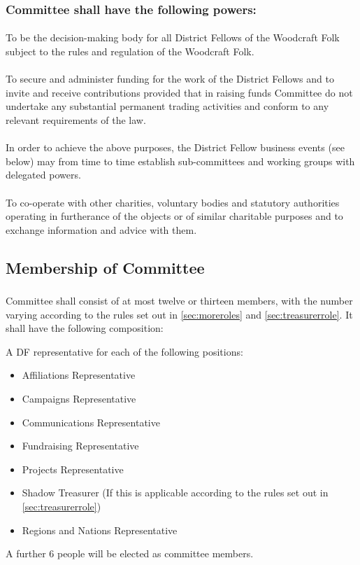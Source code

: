 \documentclass[a4paper, 12pt]{article}
\begin{document}
\subsubsection{Committee shall have the following powers:}
\paragraph{}
To be the decision-making body for all District Fellows of the Woodcraft Folk subject to the rules and regulation of the Woodcraft Folk.
\paragraph{}
To secure and administer funding for the work of the District Fellows and to invite and receive contributions provided that in raising funds Committee do not undertake any substantial permanent trading activities and conform to any relevant requirements of the law.
\paragraph{}
In order to achieve the above purposes, the District Fellow business events (see below) may from time to time establish sub-committees and working groups with delegated powers.
\paragraph{}
To co-operate with other charities, voluntary bodies and statutory authorities operating in furtherance of the objects or of similar charitable purposes and to exchange information and advice with them.

\subsection{Membership of Committee}
\subsubsection{}
\label{sec:cttemembership}
Committee shall consist of at most twelve or thirteen members, with the number varying according to the rules set out in \ref{sec:moreroles} and \ref{sec:treasurerrole}. It shall have the following composition:

A DF representative for each of the following positions:
\begin{itemize}
\item Affiliations Representative
\item Campaigns Representative
\item Communications Representative
\item Fundraising Representative
\item Projects Representative
\item Shadow Treasurer (If this is applicable according to the rules set out in \ref{sec:treasurerrole})
\item Regions and Nations Representative
\end{itemize}
A further 6 people will be elected as committee members.
\end{document}
